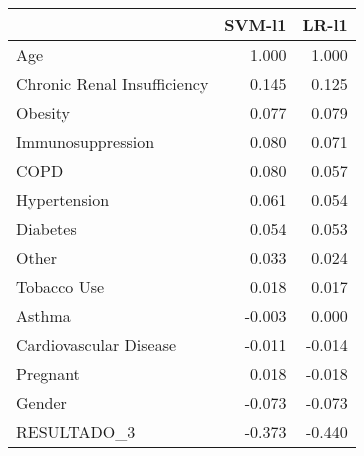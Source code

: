 \begin{tabular}{lrr}
\toprule
{} &  SVM-l1 &  LR-l1 \\
\midrule
Age                         &   1.000 &  1.000 \\
Chronic Renal Insufficiency &   0.145 &  0.125 \\
Obesity                     &   0.077 &  0.079 \\
Immunosuppression           &   0.080 &  0.071 \\
COPD                        &   0.080 &  0.057 \\
Hypertension                &   0.061 &  0.054 \\
Diabetes                    &   0.054 &  0.053 \\
Other                       &   0.033 &  0.024 \\
Tobacco Use                 &   0.018 &  0.017 \\
Asthma                      &  -0.003 &  0.000 \\
Cardiovascular Disease      &  -0.011 & -0.014 \\
Pregnant                    &   0.018 & -0.018 \\
Gender                      &  -0.073 & -0.073 \\
RESULTADO\_3                 &  -0.373 & -0.440 \\
\bottomrule
\end{tabular}
